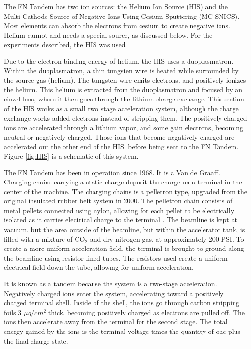 The FN Tandem has two ion sources: the Helium Ion Source (HIS) and the Multi-Cathode Source of Negative Ions Using Cesium Sputtering (MC-SNICS). Most elements can absorb the electrons from cesium to create negative ions. Helium cannot and needs a special source, as discussed below. For the experiments described, the HIS was used.

Due to the electron binding energy of helium, the HIS uses a duoplasmatron. Within the duoplasmatron, a thin tungsten wire is heated while surrounded by the source gas (helium). The tungsten wire emits electrons, and positively ionizes the helium. This helium is extracted from the duoplasmatron and focused by an einzel lens, where it then goes through the lithium charge exchange. This section of the HIS works as a small two stage acceleration system, although the charge exchange works added electrons instead of stripping them. The positively charged ions are accelerated through a lithium vapor, and some gain electrons, becoming neutral or negatively charged. Those ions that become negatively charged are accelerated out the other end of the HIS, before being sent to the FN Tandem. Figure \ref{fig:HIS} is a schematic of this system.



The FN Tandem has been in operation since 1968. It is a Van de Graaff. Charging chains carrying a static charge deposit the charge on a terminal in the center of the machine. The charging chains is a pelletron type, upgraded from the original insulated rubber belt system in 2000. The pelletron chain consists of metal pellets connected using nylon, allowing for each pellet to be electrically isolated as it carries electrical charge to the terminal \citep{nec:_pelletron}. The beamline is kept at vacuum, but the area outside of the beamline, but within the accelerator tank, is filled with a mixture of CO$_2$ and dry nitrogen gas, at approximately 200 PSI. To create a more uniform acceleration field, the terminal is brought to ground along the beamline using resistor-lined tubes. The resistors used create a uniform electrical field down the tube, allowing for uniform acceleration.

It is known as a tandem because the system is a two-stage acceleration. Negatively charged ions enter the system, accelerating toward a positively charged terminal shell. Inside of the shell, the ions go through carbon stripping foils 3 $\mu g/cm^2$ thick, becoming positively charged as electrons are pulled off. The ions then accelerate away from the terminal for the second stage. The total energy gained by the ions is the terminal voltage times the quantity of one plus the final charge state.

